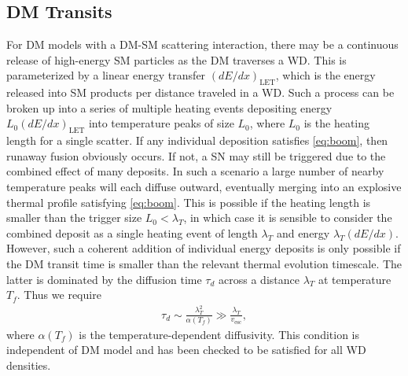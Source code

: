 \documentclass[twocolumn,showpacs,preprintnumbers,amsmath,amssymb,prd]{revtex4}
\begin{document}
\subsection{DM Transits}
\label{sec:DMdecay}

For DM models with a DM-SM scattering interaction, there may be a continuous release of high-energy SM particles as the DM traverses a WD.
This is parameterized by a linear energy transfer $(dE/dx)_\text{LET}$, which is the energy released into SM products per distance traveled in a WD.
Such a process can be broken up into a series of multiple heating events depositing energy $L_0 (d E/d x)_\text{LET}$ into temperature peaks of size $L_0$, where $L_0$ is the heating length for a single scatter. 
If any individual deposition satisfies \eqref{eq:boom}, then runaway fusion obviously occurs.
If not, a SN may still be triggered due to the combined effect of many deposits.
In such a scenario a large number of nearby temperature peaks will each diffuse outward, eventually merging into an explosive thermal profile satisfying \eqref{eq:boom}.
This is possible if the heating length is smaller than the trigger size $L_0 < \lambda_T$, in which case it is sensible to consider the combined deposit as a single heating event of length $\lambda_T$ and energy $\lambda_T (d E/d x)$.
However, such a coherent addition of individual energy deposits is only possible if the DM transit time is smaller than the relevant thermal evolution timescale.
The latter is dominated by the diffusion time $\tau_d$ across a distance $\lambda_T$ at temperature $T_f$.
Thus we require
\begin{align}
\tau_d \sim \frac{\lambda_T^2}{\alpha(T_f)} \gg \frac{\lambda_T}{v_\text{esc}},
\label{eq:SlowDiffusion}
\end{align}
where $\alpha(T_f)$ is the temperature-dependent diffusivity.
This condition is independent of DM model and has been checked to be satisfied for all WD densities.
\end{document}
